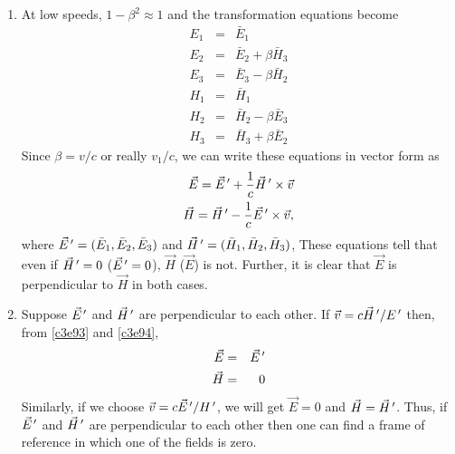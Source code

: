 \begin{enumerate}
\item At low speeds, $1 - \beta^2 \approx 1$ and the transformation equations
become
\begin{eqnarray}
E_1 &=& \bar{E}_1 \\ \label{c3e87}
E_2 &=& \bar{E}_2 + \beta\bar{H}_3 \\ \label{c3e88}
E_3 &=& \bar{E}_3 - \beta\bar{H}_2 \\ \label{c3e89}
H_1 &=& \bar{H}_1 \\ \label{c3e90}
H_2 &=& \bar{H}_2 - \beta\bar{E}_3 \\ \label{c3e92}
H_3 &=& \bar{H}_3 + \beta\bar{E}_2 \label{c3e93}
\end{eqnarray}
Since $\beta = v/c$ or really $v_1/c$, we can write these equations in vector 
form as
\begin{eqnarray}
\vec{E} = \vec{E}^{\,\prime} + \frac{1}{c}\vec{H}^{\,\prime} \times \vec{v} \label{c3e94} \\
\vec{H} = \vec{H}^{\,\prime} - \frac{1}{c}\vec{E}^{\,\prime} \times \vec{v}, \label{c3e95}
\end{eqnarray}
where $\vec{E}^{\,\prime} = (\bar{E}_1, \bar{E}_2, \bar{E}_3)$ and $\vec{H}^{\,\prime} = 
(\bar{H}_1, \bar{H}_2, \bar{H}_3)$, These equations tell that even if 
$\vec{H}^{\,\prime} = 0$ ($\vec{E}^{\,\prime} = 0$), $\vec{H}$ ($\vec{E}$) is not. Further, 
it is clear that $\vec{E}$ is perpendicular to $\vec{H}$ in both cases.

\item Suppose $\vec{E}^{\,\prime}$ and $\vec{H}^{\,\prime}$ are perpendicular to each other.
If $\vec{v} = c\vec{H}^{\,\prime}/E^{\,\prime}$ then, from \eqref{c3e93} and \eqref{c3e94},
\begin{eqnarray}
\vec{E} &=& \vec{E}^{\,\prime} \label{c3e96} \\
\vec{H} &=& 0 \label{c3e97}
\end{eqnarray}
Similarly, if we choose $\vec{v} = c\vec{E}^{\,\prime}/H^{\,\prime}$, we will get $\vec{E} = 
0$ and $\vec{H} = \vec{H}^{\,\prime}$. Thus, if $\vec{E}^{\,\prime}$ and $\vec{H}^{\,\prime}$ are 
perpendicular to each other then one can find a frame of reference in which one
of the fields is zero.


\end{enumerate}
